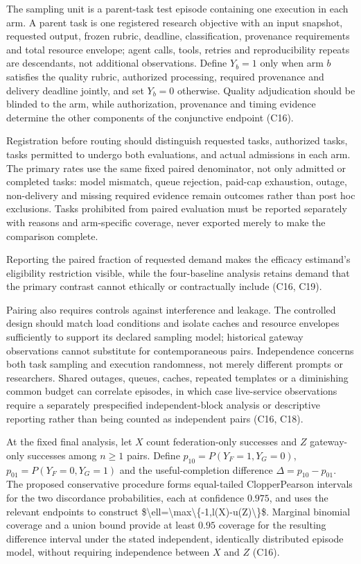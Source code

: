 \documentclass[11pt]{article}
\begin{document}
The sampling unit is a parent-task test episode containing one execution in each arm. A parent task is one registered research objective with an input snapshot, requested output, frozen rubric, deadline, classification, provenance requirements and total resource envelope; agent calls, tools, retries and reproducibility repeats are descendants, not additional observations. Define $Y_b=1$ only when arm $b$ satisfies the quality rubric, authorized processing, required provenance and delivery deadline jointly, and set $Y_b=0$ otherwise. Quality adjudication should be blinded to the arm, while authorization, provenance and timing evidence determine the other components of the conjunctive endpoint (C16).

Registration before routing should distinguish requested tasks, authorized tasks, tasks permitted to undergo both evaluations, and actual admissions in each arm. The primary rates use the same fixed paired denominator, not only admitted or completed tasks: model mismatch, queue rejection, paid-cap exhaustion, outage, non-delivery and missing required evidence remain outcomes rather than post hoc exclusions. Tasks prohibited from paired evaluation must be reported separately with reasons and arm-specific coverage, never exported merely to make the comparison complete.

Reporting the paired fraction of requested demand makes the efficacy estimand\textquoteright{}s eligibility restriction visible, while the four-baseline analysis retains demand that the primary contrast cannot ethically or contractually include (C16, C19).

Pairing also requires controls against interference and leakage. The controlled design should match load conditions and isolate caches and resource envelopes sufficiently to support its declared sampling model; historical gateway observations cannot substitute for contemporaneous pairs. Independence concerns both task sampling and execution randomness, not merely different prompts or researchers. Shared outages, queues, caches, repeated templates or a diminishing common budget can correlate episodes, in which case live-service observations require a separately prespecified independent-block analysis or descriptive reporting rather than being counted as independent pairs (C16, C18).

At the fixed final analysis, let $X$ count federation-only successes and $Z$ gateway-only successes among $n\geq1$ pairs. Define $p_{10}=P(Y_F=1,Y_G=0)$, $p_{01}=P(Y_F=0,Y_G=1)$ and the useful-completion difference $\Delta=p_{10}-p_{01}$. The proposed conservative procedure forms equal-tailed Clopper\textendash{}Pearson intervals for the two discordance probabilities, each at confidence $0.975$, and uses the relevant endpoints to construct \$\textbackslash{}ell=\textbackslash{}max\textbackslash{}\{-1,l(X)-u(Z)\textbackslash{}\}\$. Marginal binomial coverage and a union bound provide at least $0.95$ coverage for the resulting difference interval under the stated independent, identically distributed episode model, without requiring independence between $X$ and $Z$ (C16).
\end{document}
